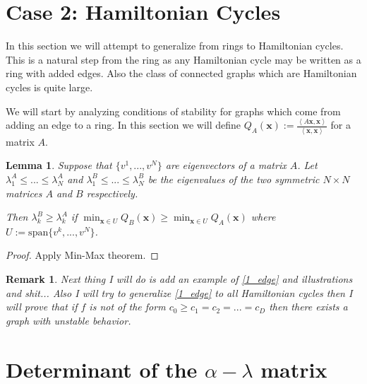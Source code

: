 \documentclass{article}
\newtheorem{lem}[thm]{Lemma}
\newtheorem{rmk}[thm]{Remark}
\newcommand{\1}{\mathbf{1}}
\newcommand{\0}{\mathbf{0}}
\newcommand{\ip}[2]{\left\langle{{#1}},{{#2}}\right\rangle}
\newcommand{\spn}{\mathrm{span}}
\newcommand{\x}{{\mathbf {{x}}}}
\begin{document}
\section{Case 2:  Hamiltonian Cycles}

In this section we will attempt to generalize from rings to Hamiltonian cycles.  
This is a natural step from the ring as any Hamiltonian cycle may be written as a ring with added edges.  
Also the class of connected graphs which are Hamiltonian cycles is quite large.  

We will start by analyzing conditions of stability for graphs which come from adding an edge to a ring.  
In this section we will define $Q_A( \x ) := \frac{\ip{A\x}{\x}}{\ip{\x}{\x}}$ for a matrix $A$.

\begin{lem}
Suppose that $\{v^1,...,v^N \}$ are eigenvectors of a matrix $A$.  
Let $\lambda_1^A \leq...\leq \lambda_N^A $ and $ \lambda_1^B \leq...\leq \lambda_N^B $ be the eigenvalues of the two symmetric $N \times N$ matrices $A$ and $B$ respectively.  

Then $\lambda_k^B \geq \lambda_k^A$ if $\min_{\x \in U} Q_B(\x) \geq \min_{\x \in U} Q_A(\x)$ where $U := \spn \{ v^k,...,v^N \}$.  
\end{lem}
\begin{proof}
Apply Min-Max theorem.
\end{proof}

\begin{rmk}
Next thing I will do is add an example of \ref{1_edge} and illustrations and shit...
Also I will try to generalize \ref{1_edge} to all Hamiltonian cycles then I will prove that if $f$ is not of the form $c_0 \geq c_1 = c_2 = ... = c_D$ then there exists a graph with unstable behavior.
\end{rmk}

\section{Determinant of the $\alpha-\lambda$ matrix}
\end{document}
